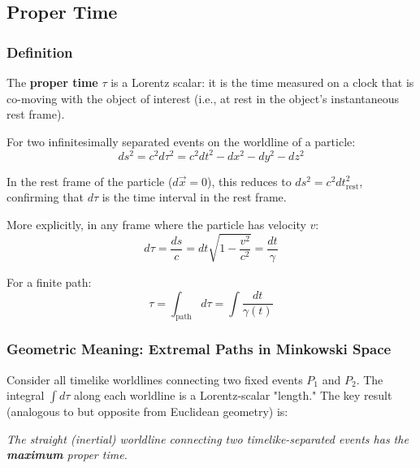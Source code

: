 \subsection{Proper Time}

\subsubsection*{Definition}

The \textbf{proper time} $\tau$ is a Lorentz scalar: it is the time measured on a clock that is co-moving with the object of interest (i.e., at rest in the object's instantaneous rest frame).

For two infinitesimally separated events on the worldline of a particle:
\begin{equation}\label{eq:lec05:proper-time-interval}
    ds^2 = c^2 d\tau^2 = c^2 dt^2 - dx^2 - dy^2 - dz^2
\end{equation}

In the rest frame of the particle ($d\vec{x} = 0$), this reduces to $ds^2 = c^2 dt_{\text{rest}}^2$, confirming that $d\tau$ is the time interval in the rest frame.

More explicitly, in any frame where the particle has velocity $v$:
\begin{equation}\label{eq:lec05:dtaudt}
    d\tau = \frac{ds}{c} = dt \sqrt{1 - \frac{v^2}{c^2}} = \frac{dt}{\gamma}
\end{equation}

For a finite path:
\begin{equation}\label{eq:lec05:proper-time-integral}
    \tau = \int_{\text{path}} d\tau = \int \frac{dt}{\gamma(t)}
\end{equation}

\subsubsection*{Geometric Meaning: Extremal Paths in Minkowski Space}

Consider all timelike worldlines connecting two fixed events $P_1$ and $P_2$. The integral $\int d\tau$ along each worldline is a Lorentz-scalar "length." The key result (analogous to but opposite from Euclidean geometry) is:

\begin{center}
\textit{The straight (inertial) worldline connecting two timelike-separated events has the \textbf{maximum} proper time.}
\end{center}

